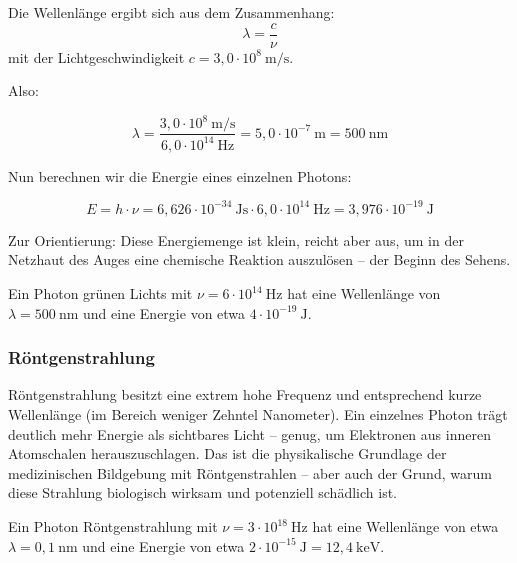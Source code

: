 Die Wellenlänge ergibt sich aus dem Zusammenhang:
\[
\lambda = \frac{c}{\nu}
\]
mit der Lichtgeschwindigkeit \( c = 3{,}0 \cdot 10^8~\mathrm{m/s} \). 

Also:

\[
\lambda = \frac{3{,}0 \cdot 10^8~\mathrm{m/s}}{6{,}0 \cdot 10^{14}~\mathrm{Hz}} = 5{,}0 \cdot 10^{-7}~\mathrm{m} = 500~\mathrm{nm}
\]

Nun berechnen wir die Energie eines einzelnen Photons:

\[
E = h \cdot \nu = 6{,}626 \cdot 10^{-34}~\mathrm{Js} \cdot 6{,}0 \cdot 10^{14}~\mathrm{Hz} = 3{,}976 \cdot 10^{-19}~\mathrm{J}
\]

Zur Orientierung: Diese Energiemenge ist klein, reicht aber aus, um in der Netzhaut des Auges eine chemische Reaktion auszulösen – der Beginn des Sehens.
\medskip

\begin{tcolorbox}[physikbox, title=Grünes Licht]
	\label{box:grünesLicht}
	Ein Photon grünen Lichts mit \( \nu = 6 \cdot 10^{14}~\mathrm{Hz} \) hat eine Wellenlänge von \( \lambda = 500~\mathrm{nm} \) und eine Energie von etwa \( 4 \cdot 10^{-19}~\mathrm{J} \).
\end{tcolorbox}

\subsubsection*{Röntgenstrahlung}
Röntgenstrahlung besitzt eine extrem hohe Frequenz und entsprechend kurze Wellenlänge (im Bereich weniger Zehntel Nanometer). Ein einzelnes Photon trägt deutlich mehr Energie als sichtbares Licht – genug, um Elektronen aus inneren Atomschalen herauszuschlagen. Das ist die physikalische Grundlage der medizinischen Bildgebung mit Röntgenstrahlen – aber auch der Grund, warum diese Strahlung biologisch wirksam und potenziell schädlich ist.
	\medskip
\begin{tcolorbox}[physikbox, title=Röntgenstrahlen]
	\label{box:röntgenstrahlen}
	Ein Photon Röntgenstrahlung mit \( \nu = 3 \cdot 10^{18}~\mathrm{Hz} \) hat eine Wellenlänge von etwa \( \lambda = 0{,}1~\mathrm{nm} \) und eine Energie von etwa \( 2 \cdot 10^{-15}~\mathrm{J} = 12{,}4~\mathrm{keV} \).
\end{tcolorbox}

